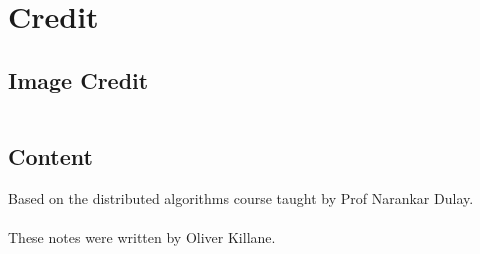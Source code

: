 \chapter{Credit}
\section*{Image Credit}
\begin{center}
	\begin{tabular}{r p{}}
	\end{tabular}
\end{center}

\section*{Content}
Based on the distributed algorithms course taught by Prof Narankar Dulay.
\\
\\ These notes were written by Oliver Killane.
